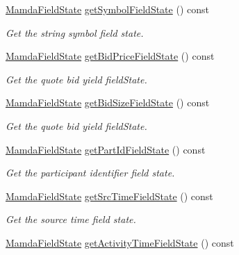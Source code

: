 \begin{CompactItemize}
\hyperlink{namespaceWombat_93aac974f2ab713554fd12a1fa3b7d2a}{Mamda\-Field\-State} \hyperlink{classWombat_1_1MamdaQuoteListener_e5281f487264bda71fde9182921d6ae5}{get\-Symbol\-Field\-State} () const 
\begin{CompactList}\small\item\em Get the string symbol field state. \item\end{CompactList}\item 
\hyperlink{namespaceWombat_93aac974f2ab713554fd12a1fa3b7d2a}{Mamda\-Field\-State} \hyperlink{classWombat_1_1MamdaQuoteListener_edb910c741c98a43134d0abcb325079e}{get\-Bid\-Price\-Field\-State} () const 
\begin{CompactList}\small\item\em Get the quote bid yield field\-State. \item\end{CompactList}\item 
\hyperlink{namespaceWombat_93aac974f2ab713554fd12a1fa3b7d2a}{Mamda\-Field\-State} \hyperlink{classWombat_1_1MamdaQuoteListener_00ecbc2964d5439e77d04ffc2d00d9e9}{get\-Bid\-Size\-Field\-State} () const 
\begin{CompactList}\small\item\em Get the quote bid yield field\-State. \item\end{CompactList}\item 
\hyperlink{namespaceWombat_93aac974f2ab713554fd12a1fa3b7d2a}{Mamda\-Field\-State} \hyperlink{classWombat_1_1MamdaQuoteListener_f9ff48ba9ea68b551b07e18ebef77a51}{get\-Part\-Id\-Field\-State} () const 
\begin{CompactList}\small\item\em Get the participant identifier field state. \item\end{CompactList}\item 
\hyperlink{namespaceWombat_93aac974f2ab713554fd12a1fa3b7d2a}{Mamda\-Field\-State} \hyperlink{classWombat_1_1MamdaQuoteListener_50550dbdc63d6a518052710d8414387c}{get\-Src\-Time\-Field\-State} () const 
\begin{CompactList}\small\item\em Get the source time field state. \item\end{CompactList}\item 
\hyperlink{namespaceWombat_93aac974f2ab713554fd12a1fa3b7d2a}{Mamda\-Field\-State} \hyperlink{classWombat_1_1MamdaQuoteListener_79f601394c430d4883bcb41f0b470b29}{get\-Activity\-Time\-Field\-State} () const 

\end{CompactItemize}
